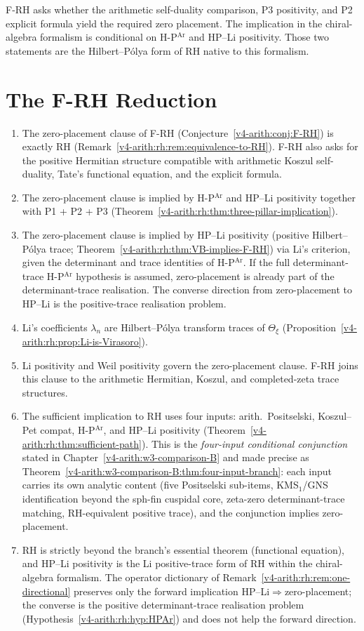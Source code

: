 F-RH asks whether the arithmetic self-duality comparison, P3
positivity, and P2 explicit formula yield the required zero placement.
The implication in the chiral-algebra formalism is conditional
on H-P\(^{\mathrm{Ar}}\) and HP--Li positivity. Those two statements
are the Hilbert--P\'olya form of RH native to this formalism.

\section{The F-RH Reduction}
\label{v4-arith:rh:summary}

\begin{enumerate}
\item The zero-placement clause of F-RH
(Conjecture~\ref{v4-arith:conj:F-RH}) is exactly RH
(Remark~\ref{v4-arith:rh:rem:equivalence-to-RH}). F-RH
also asks for the positive Hermitian structure compatible with
arithmetic Koszul self-duality, Tate's functional equation, and the
explicit formula.
\item The zero-placement clause is implied by H-P\(^{\mathrm{Ar}}\) and
HP--Li positivity together with P1 + P2 + P3
(Theorem~\ref{v4-arith:rh:thm:three-pillar-implication}).
\item The zero-placement clause is implied by HP--Li positivity
(positive Hilbert--P\'olya trace;
Theorem~\ref{v4-arith:rh:thm:VB-implies-F-RH}) via Li's criterion, given
the determinant and trace identities of H-P\(^{\mathrm{Ar}}\). If the
full determinant-trace H-P\(^{\mathrm{Ar}}\) hypothesis is assumed,
zero-placement is already part of the determinant-trace realisation.
The converse direction from zero-placement to HP--Li is the
positive-trace realisation problem.
\item Li's coefficients \(\lambda_{n}\) are Hilbert--P\'olya
transform traces of \(\Theta_{\xi}\)
(Proposition~\ref{v4-arith:rh:prop:Li-is-Virasoro}).
\item Li positivity and Weil positivity govern the zero-placement
clause. F-RH joins this clause to the arithmetic Hermitian,
Koszul, and completed-zeta trace structures.
\item The sufficient implication to RH uses four inputs:
arith.~Positselski, Koszul--Pet compat, H-P\(^{\mathrm{Ar}}\), and
HP--Li positivity
(Theorem~\ref{v4-arith:rh:thm:sufficient-path}). This is the
\emph{four-input conditional conjunction} stated in
Chapter~\ref{v4-arith:w3-comparison-B} and made precise as
Theorem~\ref{v4-arith:w3-comparison-B:thm:four-input-branch}: each input
carries its own analytic content (five Positselski sub-items,
KMS\(_{1}\)/GNS identification beyond the sph-fin cuspidal core,
zeta-zero determinant-trace matching, RH-equivalent positive trace),
and the conjunction implies zero-placement.
\item RH is strictly beyond the branch's essential theorem
(functional equation), and HP--Li positivity is the
Li positive-trace form of RH within the chiral-algebra formalism.
The operator dictionary of
Remark~\ref{v4-arith:rh:rem:one-directional} preserves only the
forward implication HP--Li\(\Rightarrow\)zero-placement; the converse is the
positive determinant-trace realisation problem
(Hypothesis~\ref{v4-arith:rh:hyp:HPAr}) and does not
help the forward direction.
\end{enumerate}
